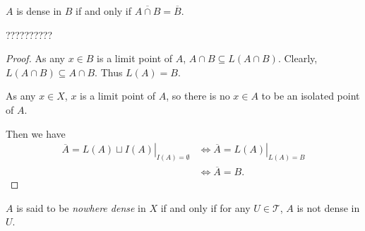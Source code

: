 \begin{proposition}
	$A$ is dense in $B$ if and only if $\overline{A \cap B} = \overline B$.
	
	??????????
	
	
	\begin{proof}		
		As any $x \in B$ is a limit point of $A$, $A \cap B \subseteq L(A \cap B)$. Clearly, $L(A \cap B) \subseteq A \cap B$. Thus $L(A) = B$.
		
		As any $x \in X$, $x$ is a limit point of $A$, so there is no $x \in A$ to be an isolated point of $A$.
		
		Then we have
		$$
		\begin{aligned}
			\left. \overline A = L(A) \sqcup I(A) \right|_{I(A) = \emptyset} &\iff \left. \overline A = L(A) \right|_{L(A) = B} \\
			&\iff \overline A = B.
		\end{aligned}
		$$
	\end{proof}
\end{proposition}


\begin{definition}
	$A$ is said to be \textit{nowhere dense} in $X$ if and only if for any $U \in \mathcal T$, $A$ is not dense in $U$.
\end{definition}


